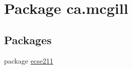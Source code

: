 \hypertarget{namespaceca_1_1mcgill}{}\section{Package ca.\+mcgill}
\label{namespaceca_1_1mcgill}
\subsection*{Packages}
\begin{DoxyCompactItemize}
\item 
package \hyperlink{namespaceca_1_1mcgill_1_1ecse211}{ecse211}
\end{DoxyCompactItemize}
